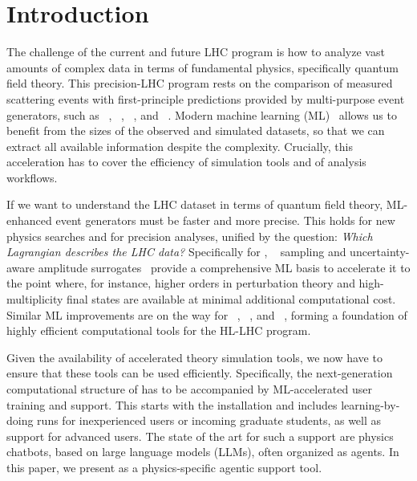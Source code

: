 \documentclass[submission, Phys]{SciPost}
\begin{document}
\clearpage

\clearpage
\section{Introduction}

The challenge of the current and future LHC program is how to analyze vast amounts of complex data in terms of fundamental physics, specifically quantum field theory. This precision-LHC program rests on the comparison of measured scattering events with first-principle predictions provided by multi-purpose event generators, such as  \pythia~\cite{Sjostrand:2014zea}, \mg~\cite{Maltoni:2002qb,Alwall:2007st,Alwall:2011uj,Alwall:2014hca}, \sherpa~\cite{Sherpa:2019gpd}, and \herwig~\cite{Bewick:2023tfi}. Modern machine learning (ML)~\cite{Butter:2022rso,Plehn:2022ftl} allows us to benefit from the sizes of the observed and simulated datasets, so that we can extract all available information despite the complexity. Crucially, this acceleration has to cover the efficiency of simulation tools and of analysis workflows.

If we want to understand the LHC dataset in terms of quantum field theory, ML-enhanced event generators must be faster and more precise. This holds for new physics searches and for precision analyses, unified by the question: \textsl{Which Lagrangian describes the LHC data?} Specifically for \mg,  \madnis~\cite{Heimel:2022wyj,Heimel:2023ngj,Heimel:2024wph} sampling and uncertainty-aware amplitude surrogates~\cite{Bahl:2024gyt,Bahl:2025xvx,Bahl:2026qaf} provide a comprehensive ML basis to accelerate it to the point where, for instance, higher orders in perturbation theory and high-multiplicity final states are available at minimal additional computational cost. Similar ML improvements are on the way for \sherpa~\cite{janssen:2025zke,Herrmann:2025nnz}, \pythia~\cite{Butter:2025wxn}, and \herwig~\cite{Chan:2023icm}, forming a foundation of highly efficient computational tools for the HL-LHC program.

Given the availability of accelerated theory simulation tools, we now have to ensure that these tools can be used efficiently. Specifically, the next-generation computational structure of  has to be accompanied by ML-accelerated user training and support. This starts with the installation and includes learning-by-doing \mg runs for inexperienced users or incoming graduate students, as well as support for advanced users. The state of the art for such a support are physics chatbots, based on large language models (LLMs), often organized as agents. In this paper, we present \ma as a physics-specific agentic \mg support tool.
\end{document}
